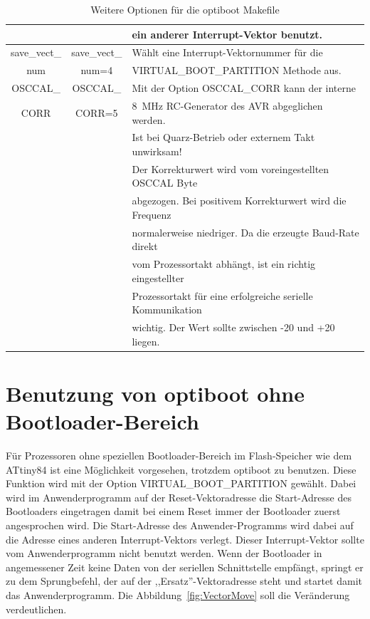 \begin{table}[H]
\begin{center}
\begin{tabular}{| c | c | l |}
		   &                 & ein anderer Interrupt-Vektor benutzt.          \\
    \hline
 save\_vect\_      & save\_vect\_    & Wählt eine Interrupt-Vektornummer für die  \\
      num          &    num=4        & VIRTUAL\_BOOT\_PARTITION Methode aus.        \\
    \hline
 OSCCAL\_          & OSCCAL\_       & Mit der Option OSCCAL\_CORR kann der interne \\
 CORR              & CORR=5         & 8~MHz RC-Generator des AVR abgeglichen werden. \\
                   &                & Ist bei Quarz-Betrieb oder externem Takt unwirksam! \\
                   &                & Der Korrekturwert wird vom voreingestellten OSCCAL Byte \\
                   &                & abgezogen. Bei positivem Korrekturwert wird die Frequenz \\
                   &                & normalerweise niedriger. Da die erzeugte Baud-Rate direkt \\
                   &                & vom Prozessortakt abhängt, ist ein richtig eingestellter \\
                   &                & Prozessortakt für eine erfolgreiche serielle Kommunikation \\
                   &                & wichtig. Der Wert sollte zwischen -20 und +20 liegen. \\
    \hline
    \end{tabular}
  \end{center}
  \caption{Weitere Optionen für die optiboot Makefile}
  \label{tab:options2}
\end{table}

\section{Benutzung von optiboot ohne Bootloader-Bereich}

Für Prozessoren ohne speziellen Bootloader-Bereich im Flash-Speicher wie dem ATtiny84 ist
eine Möglichkeit vorgesehen, trotzdem optiboot zu benutzen. 
Diese Funktion wird mit der Option VIRTUAL\_BOOT\_PARTITION gewählt.
Dabei wird im Anwenderprogramm auf der Reset-Vektoradresse die Start-Adresse des Bootloaders
eingetragen damit bei einem Reset immer der Bootloader zuerst angesprochen wird.
Die Start-Adresse des Anwender-Programms wird dabei auf die Adresse eines anderen
Interrupt-Vektors verlegt. Dieser Interrupt-Vektor sollte vom Anwenderprogramm nicht benutzt werden.
Wenn der Bootloader in angemessener Zeit keine Daten von der seriellen Schnittstelle
empfängt, springt er zu dem Sprungbefehl, der auf der ,,Ersatz''-Vektoradresse steht und
startet damit das Anwenderprogramm.
Die Abbildung~\ref{fig:VectorMove} soll die Veränderung verdeutlichen.


